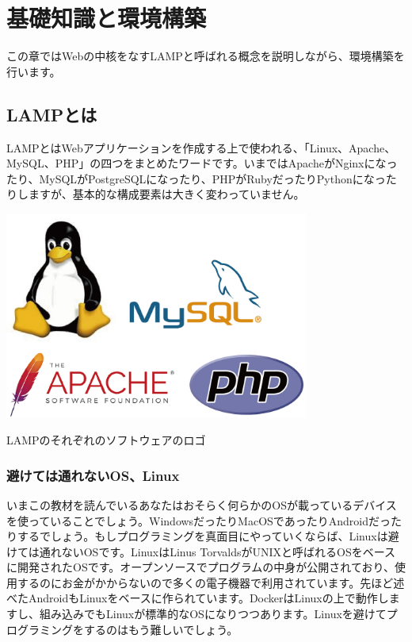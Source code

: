 \chapter{基礎知識と環境構築}

この章ではWebの中核をなすLAMPと呼ばれる概念を説明しながら、環境構築を行います。

\section{LAMPとは}

LAMPとはWebアプリケーションを作成する上で使われる、「Linux、Apache、MySQL、PHP」の四つをまとめたワードです。いまではApacheがNginxになったり、MySQLがPostgreSQLになったり、PHPがRubyだったりPythonになったりしますが、基本的な構成要素は大きく変わっていません。

\begin{center}
\includegraphics[width=10cm]{./chap1_fig/LAMP.png}

LAMPのそれぞれのソフトウェアのロゴ
\end{center}

\subsection{避けては通れないOS、Linux}

いまこの教材を読んでいるあなたはおそらく何らかのOSが載っているデバイスを使っていることでしょう。WindowsだったりMacOSであったりAndroidだったりするでしょう。もしプログラミングを真面目にやっていくならば、Linuxは避けては通れないOSです。LinuxはLinus TorvaldsがUNIXと呼ばれるOSをベースに開発されたOSです。オープンソースでプログラムの中身が公開されており、使用するのにお金がかからないので多くの電子機器で利用されています。先ほど述べたAndroidもLinuxをベースに作られています。DockerはLinuxの上で動作しますし、組み込みでもLinuxが標準的なOSになりつつあります。Linuxを避けてプログラミングをするのはもう難しいでしょう。

